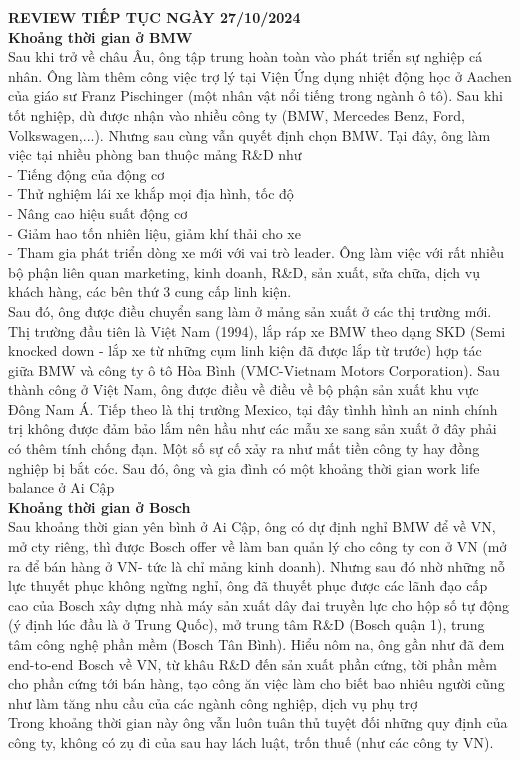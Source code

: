 \documentclass{article}
\newcommand\tab[1][1cm]{\hspace*{#1}}
\begin{document}
\tab \textbf{REVIEW TIẾP TỤC NGÀY 27/10/2024}\\
\tab \textbf{Khoảng thời gian ở BMW}\\
\tab Sau khi trở về châu Âu, ông tập trung hoàn toàn vào phát triển sự nghiệp cá nhân. Ông làm thêm công việc trợ lý
tại Viện Ứng dụng nhiệt động học ở Aachen của giáo sư Franz Pischinger (một nhân vật nổi tiếng trong ngành ô tô). 
Sau khi tốt nghiệp, dù được nhận vào nhiều công ty (BMW, Mercedes Benz, Ford, Volkswagen,...). Nhưng sau cùng vẫn
quyết định chọn BMW. Tại đây, ông làm việc tại nhiều phòng ban thuộc mảng R\&D như\\ 
\tab\tab - Tiếng động của động cơ \\
\tab\tab - Thử nghiệm lái xe khắp mọi địa hình, tốc độ\\
\tab\tab - Nâng cao hiệu suất động cơ\\
\tab\tab - Giảm hao tốn nhiên liệu, giảm khí thải cho xe\\
\tab\tab - Tham gia phát triển dòng xe mới với vai trò leader. Ông làm việc với rất nhiều bộ phận liên quan marketing,
kinh doanh, R\&D, sản xuất, sửa chữa, dịch vụ khách hàng, các bên thứ 3 cung cấp linh kiện. \\
\tab Sau đó, ông được điều chuyển sang làm ở mảng sản xuất ở các thị trường mới. Thị trường đầu tiên là Việt Nam (1994), 
lắp ráp xe BMW theo dạng SKD (Semi knocked down - lắp xe từ những cụm linh kiện đã được lắp từ trước) 
hợp tác giữa BMW và công ty ô tô Hòa Bình (VMC-Vietnam Motors Corporation). Sau thành công ở Việt Nam, ông được điều về điều 
về bộ phận sản xuất khu vực Đông Nam Á. Tiếp theo là thị trường Mexico, tại đây tìnhh hình an ninh chính trị không được đảm 
bảo lắm nên hầu như các mẫu xe sang sản xuất ở đây phải có thêm tính chống đạn. Một số sự cố xảy ra như mất tiền công ty hay
đồng nghiệp bị bắt cóc. Sau đó, ông và gia đình có một khoảng thời gian work life balance ở Ai Cập\\
\tab \textbf{Khoảng thời gian ở Bosch}\\
\tab Sau khoảng thời gian yên bình ở Ai Cập, ông có dự định nghỉ BMW để về VN, mở cty riêng, thì được Bosch offer về làm ban
quản lý cho công ty con ở VN (mở ra để bán hàng ở VN- tức là chỉ mảng kinh doanh). Nhưng sau đó nhờ những nỗ lực thuyết phục
không ngừng nghỉ, ông đã thuyết phục được các lãnh đạo cấp cao của Bosch xây dựng nhà máy sản xuất dây đai truyền lực cho hộp
số tự động (ý định lúc đầu là ở Trung Quốc), mở trung tâm R\&D (Bosch quận 1), trung tâm công nghệ phần mềm (Bosch Tân Bình).
Hiểu nôm na, ông gần như đã đem end-to-end Bosch về VN, từ khâu R\&D đến sản xuất phần cứng, tời phần mềm cho phần cứng
tới bán hàng, tạo công ăn việc làm cho biết bao nhiêu người cũng như làm tăng nhu cầu của các ngành công nghiệp, dịch vụ phụ trợ\\
\tab Trong khoảng thời gian này ông vẫn luôn tuân thủ tuyệt đối những quy định của công ty, không có zụ đi của sau hay lách luật, 
trốn thuế (như các công ty VN).\\
\end{document}
